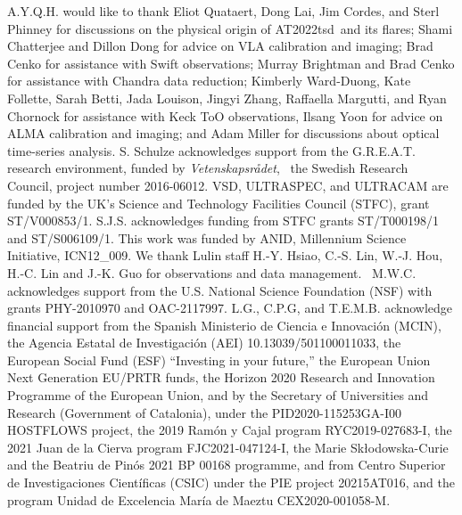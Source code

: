 \documentclass{nature_plusfigure}
\newcommand{\at}{AT2022tsd}
\begin{document}
\begin{addendum}

\item A.Y.Q.H. would like to thank Eliot Quataert, Dong Lai, Jim Cordes, and Sterl Phinney for discussions on the physical origin of \at\ and its flares; Shami Chatterjee and Dillon Dong for advice on VLA calibration and imaging; Brad Cenko for assistance with Swift observations; Murray Brightman and Brad Cenko for assistance with Chandra data reduction; Kimberly Ward-Duong, Kate Follette, Sarah Betti, Jada Louison, Jingyi Zhang, Raffaella Margutti, and Ryan Chornock for assistance with Keck ToO observations, Ilsang Yoon for advice on ALMA calibration and imaging; and Adam Miller for discussions about optical time-series analysis.
S. Schulze acknowledges support from the G.R.E.A.T. research environment, funded by {\em Vetenskapsr\aa det},  the Swedish Research Council, project number 2016-06012.
VSD, ULTRASPEC, and ULTRACAM are funded by the UK’s Science and Technology Facilities Council (STFC), grant ST/V000853/1.
S.J.S. acknowledges funding from STFC grants ST/T000198/1 and ST/S006109/1.
This work was funded by ANID, Millennium Science Initiative, ICN12\_009.
We thank Lulin staff H.-Y. Hsiao, C.-S. Lin, W.-J. Hou, H.-C. Lin and J.-K. Guo for observations and data management. 
M.W.C. acknowledges support from the U.S. National Science Foundation (NSF) with grants PHY-2010970 and OAC-2117997.
L.G., C.P.G, and T.E.M.B. acknowledge financial support from the Spanish Ministerio de Ciencia e Innovaci\'on (MCIN), the Agencia Estatal de Investigaci\'on (AEI) 10.13039/501100011033, the European Social Fund (ESF) ``Investing in your future,” the European Union Next Generation EU/PRTR funds, the Horizon 2020 Research and Innovation Programme of the European Union, and by the Secretary of Universities and Research (Government of Catalonia), under the PID2020-115253GA-I00 HOSTFLOWS project, the 2019 Ram\'on y Cajal program RYC2019-027683-I, the 2021 Juan de la Cierva program FJC2021-047124-I, the Marie Skłodowska-Curie and the Beatriu de Pin\'os 2021 BP 00168 programme, and from Centro Superior de Investigaciones Cient\'ificas (CSIC) under the PIE project 20215AT016, and the program Unidad de Excelencia Mar\'ia de Maeztu CEX2020-001058-M.

\end{addendum}
\end{document}
